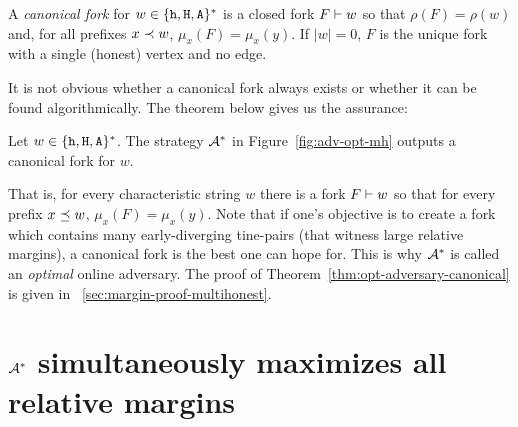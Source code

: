 \begin{definition}
  A \emph{canonical fork} for $w \in \{\mathtt{h}, \mathtt{H}, \mathtt{A}\}^*$ 
  is a closed fork $F \vdash w$ so that 
  $\rho(F) = \rho(w)$ 
  and, for all prefixes $x \prec w$, $\mu_x(F) = \mu_x(y)$. 
  If $|w| = 0$, $F$ is 
  the unique fork with a single (honest) vertex and no edge. 
\end{definition}

It is not obvious whether a canonical fork always exists 
or whether it can be found algorithmically. 
The theorem below gives us the assurance:


\begin{theorem}\label{thm:opt-adversary-canonical}
  Let $w \in \{\mathtt{h}, \mathtt{H}, \mathtt{A}\}^*$. 
  The strategy $\mathcal{A}^*$ in Figure~\ref{fig:adv-opt-mh}
  outputs a canonical fork for $w$.  
\end{theorem}
That is, for every characteristic string $w$ 
there is a fork $F \vdash w$ so that 
for every prefix $x \preceq w$, $\mu_x(F) = \mu_x(y)$. 
Note that if one's objective is to create a fork 
which contains many early-diverging tine-pairs (that witness large relative margins), 
a canonical fork is the best one can hope for. 
This is why $\mathcal{A}^*$ is called an \emph{optimal} online adversary. 
The proof of Theorem~\ref{thm:opt-adversary-canonical} 
is given in \Section~\ref{sec:margin-proof-multihonest}.



\section{\texorpdfstring{$\mathcal{A}^*$}{The optimal adversary} simultaneously maximizes all relative margins}\label{sec:opt-adv-lowerbound}

